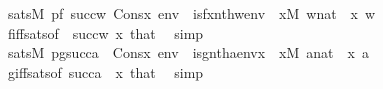 \begin{isabellebody}
\ {\isachardoublequoteopen}sats{\isacharparenleft}{\kern0pt}M{\isacharcomma}{\kern0pt}\ pf{\isacharparenleft}{\kern0pt}{}{\isacharcomma}{\kern0pt}\ succ{\isacharparenleft}{\kern0pt}w{\isacharparenright}{\kern0pt}{\isacharparenright}{\kern0pt}{\isacharcomma}{\kern0pt}\ Cons{\isacharparenleft}{\kern0pt}x{\isacharcomma}{\kern0pt}\ env{\isacharparenright}{\kern0pt}{\isacharparenright}{\kern0pt}\ {\isasymlongleftrightarrow}\ is{\isacharunderscore}{\kern0pt}f{\isacharparenleft}{\kern0pt}x{\isacharcomma}{\kern0pt}nth{\isacharparenleft}{\kern0pt}w{\isacharcomma}{\kern0pt}env{\isacharparenright}{\kern0pt}{\isacharparenright}{\kern0pt}{\isachardoublequoteclose}\ \ {\isachardoublequoteopen}x{\isasymin}M{\isachardoublequoteclose}\ {\isachardoublequoteopen}w{\isasymin}nat{\isachardoublequoteclose}\ \ x\ w\isanewline
\ \ \ \ \isamarkupfalse%
\ f{\isacharunderscore}{\kern0pt}iff{\isacharunderscore}{\kern0pt}sats{\isacharbrackleft}{\kern0pt}of\ {}\ {\isachardoublequoteopen}succ{\isacharparenleft}{\kern0pt}w{\isacharparenright}{\kern0pt}{\isachardoublequoteclose}\ x{\isacharbrackright}{\kern0pt}\ that\ \isamarkupfalse%
\ simp\isanewline
\ \ \isamarkupfalse%
\isanewline
\ \ \isamarkupfalse%
\ {\isachardoublequoteopen}sats{\isacharparenleft}{\kern0pt}M{\isacharcomma}{\kern0pt}\ pg{\isacharparenleft}{\kern0pt}succ{\isacharparenleft}{\kern0pt}a{\isacharparenright}{\kern0pt}{\isacharcomma}{\kern0pt}\ {}{\isacharparenright}{\kern0pt}{\isacharcomma}{\kern0pt}\ Cons{\isacharparenleft}{\kern0pt}x{\isacharcomma}{\kern0pt}\ env{\isacharparenright}{\kern0pt}{\isacharparenright}{\kern0pt}\ {\isasymlongleftrightarrow}\ is{\isacharunderscore}{\kern0pt}g{\isacharparenleft}{\kern0pt}nth{\isacharparenleft}{\kern0pt}a{\isacharcomma}{\kern0pt}env{\isacharparenright}{\kern0pt}{\isacharcomma}{\kern0pt}x{\isacharparenright}{\kern0pt}{\isachardoublequoteclose}\ \ {\isachardoublequoteopen}x{\isasymin}M{\isachardoublequoteclose}\ {\isachardoublequoteopen}a{\isasymin}nat{\isachardoublequoteclose}\ \ x\ a\isanewline
\ \ \ \ \isamarkupfalse%
\ g{\isacharunderscore}{\kern0pt}iff{\isacharunderscore}{\kern0pt}sats{\isacharbrackleft}{\kern0pt}of\ {\isachardoublequoteopen}succ{\isacharparenleft}{\kern0pt}a{\isacharparenright}{\kern0pt}{\isachardoublequoteclose}\ {}\ x{\isacharbrackright}{\kern0pt}\ that\ \isamarkupfalse%
\ simp\isanewline
\ \ \isamarkupfalse%
\isanewline

\end{isabellebody}
